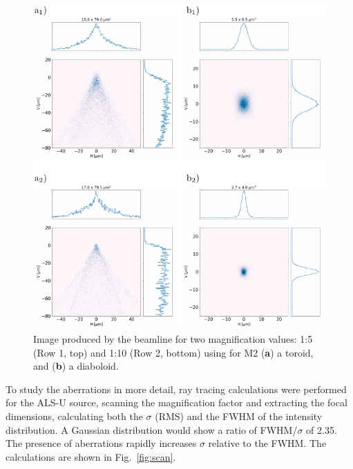 \documentclass[preprint]{iucr}       %
\newcommand{\inred}[1]{{\color{red}#1}}
\begin{document}
\begin{figure}\label{fig:demagnification}
\includegraphics[width=1.0\textwidth]{figures/fig5.pdf}
% 
% 
\caption{Image produced by the beamline for two magnification values: 1:5 (Row 1, top) and 1:10 (Row 2, bottom) using for M2 (\textbf{a}) a toroid, and (\textbf{b}) a diaboloid.}
\end{figure}

To study the aberrations in more detail, ray tracing calculations were performed \inred{for the ALS-U source}, scanning the magnification factor and extracting the focal dimensions, \inred{calculating both the $\sigma$ (RMS) and} the FWHM of the intensity distribution. A Gaussian distribution would show a ratio of FWHM/$\sigma$ of 2.35. The presence of aberrations rapidly increases $\sigma$ relative to the FWHM. The calculations are shown in Fig.~\ref{fig:scan}.
\end{document}
